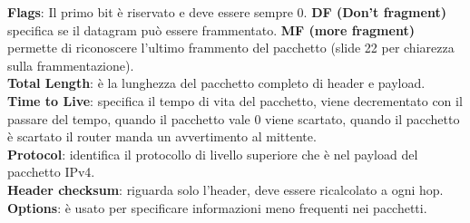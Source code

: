 \documentclass{article}
\begin{document}
\textbf{Flags}: Il primo bit è riservato e deve essere sempre 0. \textbf{DF (Don't fragment)} specifica se il datagram può essere frammentato. \textbf{MF (more fragment)} permette di riconoscere l'ultimo frammento del pacchetto (slide 22 per chiarezza sulla frammentazione).\\
\textbf{Total Length}: è la lunghezza del pacchetto completo di header e payload.\\
\textbf{Time to Live}: specifica il tempo di vita del pacchetto, viene decrementato con il passare del tempo, quando il pacchetto vale 0 viene scartato, quando il pacchetto è scartato il router manda un avvertimento al mittente.\\
\textbf{Protocol}: identifica il protocollo di livello superiore che è nel payload del pacchetto IPv4.\\
\textbf{Header checksum}: riguarda solo l'header, deve essere ricalcolato a ogni hop.\\
\textbf{Options}: è usato per specificare informazioni meno frequenti nei pacchetti.
\end{document}
